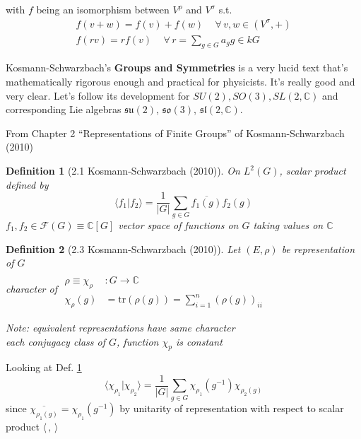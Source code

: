 \documentclass[10pt]{amsart}
\newtheorem{definition}{Definition}
\begin{document}
\begin{multicols*}{2}
with $f$ being an isomorphism between $V^{\rho}$ and $V^{\sigma}$ s.t. 
\[
\begin{gathered}
  f(v+w) = f(v) + f(w) \quad \, \forall \, v,w \in (V^{\sigma},+) \\ 
  f(rv) = rf(v) \quad \, \forall \, r  = \sum_{g \in G} a_g g \in kG
\end{gathered}
\]

Kosmann-Schwarzbach's \textbf{Groups and Symmetries}\cite{YKosmann-Schwarzbach2010} is a very lucid text that's mathematically rigorous enough and practical for physicists.  It's really good and very clear.  Let's follow its development for $SU(2), SO(3), SL(2,\mathbb{C})$ and corresponding Lie algebras $\mathfrak{su}(2)$, $\mathfrak{so}(3)$, $\mathfrak{sl}(2,\mathbb{C})$.  

From Chapter 2 ``Representations of Finite Groups'' of Kosmann-Schwarzbach (2010) \cite{YKosmann-Schwarzbach2010}

\begin{definition}[2.1 Kosmann-Schwarzbach (2010)\cite{YKosmann-Schwarzbach2010}] \label{Def:2.1scalarproductG}
  On $L^2(G)$, scalar product defined by 
\[
\langle f_1 | f_2 \rangle = \frac{1}{|G|} \sum_{g\in G} \overline{f_1(g)} f_2(g)
\]
$f_1,f_2 \in \mathcal{F}(G) \equiv \mathbb{C}[G]$ vector space of functions on $G$ taking values on $\mathbb{C}$
\end{definition}

\begin{definition}[2.3 Kosmann-Schwarzbach (2010)\cite{YKosmann-Schwarzbach2010}]
  Let $(E,\rho)$ be representation of $G$ \\
  character of $\begin{aligned} & \quad \\ 
     \rho \equiv \chi_{\rho} & : G \to \mathbb{C} \\
     \chi_{\rho}(g) & = \text{tr}( \rho(g)) = \sum_{i=1}^n (\rho(g))_{ii} \end{aligned}$ 

Note: equivalent representations have same character \\
each conjugacy class of $G$, function $\chi_p$ is constant
\end{definition}

Looking at Def. \ref{Def:2.1scalarproductG}
\[
\langle \chi_{\rho_1} | \chi_{\rho_2} \rangle = \frac{1}{|G| } \sum_{g\in G} \chi_{\rho_1}(g^{-1}) \chi_{\rho_2(g)}
\]
since $\overline{\chi_{\rho_1(g)}} = \chi_{\rho_1}(g^{-1})$ by unitarity of representation with respect to scalar product $\langle \, , \, \rangle$


\end{multicols*}
\end{document}
